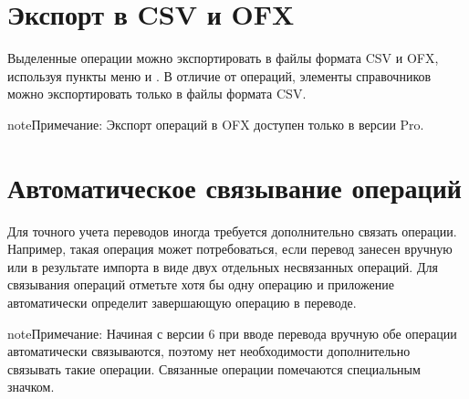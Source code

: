 \documentclass[a4paper,10pt,russian]{sphinxmanual}
\begin{document}
\noindent{}

\noindent{}


\section{Экспорт в CSV и OFX}
\label{\detokenize{bulk-actions:csv-ofx}}
\sphinxAtStartPar
Выделенные операции можно экспортировать в файлы формата CSV и OFX, используя пункты меню 
и . В отличие от операций, элементы справочников можно экспортировать только в файлы формата
CSV.

\begin{sphinxadmonition}{note}{Примечание:}
\sphinxAtStartPar
Экспорт операций в OFX доступен только в версии Pro.
\end{sphinxadmonition}

\noindent{}

\noindent{}

\noindent{}


\section{Автоматическое связывание операций}
\label{\detokenize{bulk-actions:id7}}
\sphinxAtStartPar
Для точного учета переводов иногда требуется дополнительно связать операции. Например,
такая операция может потребоваться, если перевод занесен вручную или в результате импорта
в виде двух отдельных несвязанных операций. Для связывания операций отметьте хотя бы
одну операцию и приложение автоматически определит завершающую операцию в переводе.

\noindent{}

\begin{sphinxadmonition}{note}{Примечание:}
\sphinxAtStartPar
Начиная с версии 6 при вводе перевода вручную обе операции автоматически связываются, поэтому нет
необходимости дополнительно связывать такие операции. Связанные операции помечаются специальным значком.
\end{sphinxadmonition}
\end{document}
